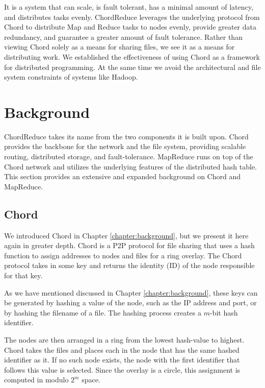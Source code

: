 It is a system that can scale, is fault tolerant, has a minimal amount of latency, and distributes tasks evenly.  
ChordReduce leverages the underlying protocol from Chord \cite{chord} to distribute Map and Reduce tasks to nodes evenly, provide greater data redundancy, and guarantee a greater amount of fault tolerance. 
Rather than viewing Chord solely as a means for sharing files, we see it as a means for distributing work. We established the effectiveness of using Chord as a framework for distributed programming. At the same time we avoid the architectural and file system constraints of systems like Hadoop.  


\section{Background}
ChordReduce takes its name from the two components it is built upon.
Chord \cite{chord} provides the backbone for the network and the file system, providing scalable routing, distributed storage, and fault-tolerance.   
MapReduce runs on top of the Chord network and utilizes the underlying features of the distributed hash table.  This section provides an extensive and expanded background on Chord and MapReduce.


\subsection{Chord}
\label{sec:chord-detail}
We introduced Chord in Chapter \ref{chapter:background}, but we present it here again in greater depth.
Chord \cite{chord} is a P2P protocol for file sharing that uses a hash function to assign addresses to nodes and files for a ring overlay. 
The Chord protocol takes in some key and returns the identity (ID) of the node responsible for that key.  

As we have mentioned discussed in Chapter \ref{chapter:background}, these keys can be generated by hashing a value of the node, such as the IP address and port, or by hashing the filename of a file.  
The hashing process creates a $m$-bit hash identifier.

The nodes are then arranged in a ring from the lowest hash-value to highest.  Chord takes the files and places each in the node that has the same hashed identifier as it.  If no such node exists, the node with the first identifier that follows this value is selected. Since the overlay is a circle, this assignment is computed in modulo $2^m$ space.  

